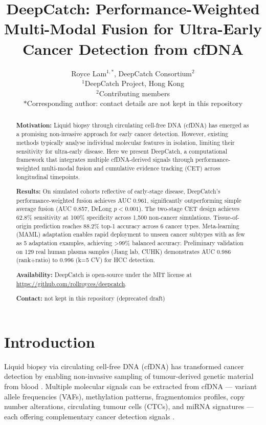 \documentclass[11pt,a4paper]{article}
\title{\textbf{DeepCatch: Performance-Weighted Multi-Modal Fusion for Ultra-Early Cancer Detection from cfDNA}}
\author{Royce Lam$^{1,\ast}$, DeepCatch Consortium$^{2}$ \\
\small $^{1}$DeepCatch Project, Hong Kong \\
\small $^{2}$Contributing members \\
\small $\ast$Corresponding author: contact details are not kept in this repository}
\date{}
\begin{document}
\maketitle

\begin{abstract}
\textbf{Motivation:} Liquid biopsy through circulating cell-free DNA (cfDNA) has emerged as a promising non-invasive approach for early cancer detection. However, existing methods typically analyse individual molecular features in isolation, limiting their sensitivity for ultra-early disease. Here we present DeepCatch, a computational framework that integrates multiple cfDNA-derived signals through performance-weighted multi-modal fusion and cumulative evidence tracking (CET) across longitudinal timepoints.

\textbf{Results:} On simulated cohorts reflective of early-stage disease, DeepCatch's performance-weighted fusion achieves AUC 0.961, significantly outperforming simple average fusion (AUC 0.857, DeLong $p < 0.001$). The two-stage CET design achieves 62.8\% sensitivity at 100\% specificity across 1,500 non-cancer simulations. Tissue-of-origin prediction reaches 88.2\% top-1 accuracy across 6 cancer types. Meta-learning (MAML) adaptation enables rapid deployment to unseen cancer subtypes with as few as 5 adaptation examples, achieving >99\% balanced accuracy. Preliminary validation on 129 real human plasma samples (Jiang lab, CUHK) demonstrates AUC 0.986 (rank+ratio) to 0.996 (k=5 CV) for HCC detection.

\textbf{Availability:} DeepCatch is open-source under the MIT license at \url{https://github.com/rollroyces/deepcatch}.

\textbf{Contact:} not kept in this repository (deprecated draft)
\end{abstract}

\section{Introduction}

Liquid biopsy via circulating cell-free DNA (cfDNA) has transformed cancer detection by enabling non-invasive sampling of tumour-derived genetic material from blood \citep{wan2017liquid}. Multiple molecular signals can be extracted from cfDNA — variant allele frequencies (VAFs), methylation patterns, fragmentomics profiles, copy number alterations, circulating tumour cells (CTCs), and miRNA signatures — each offering complementary cancer detection signals \citep{corcoran2018liquid, heitzer2019current}.
\end{document}
